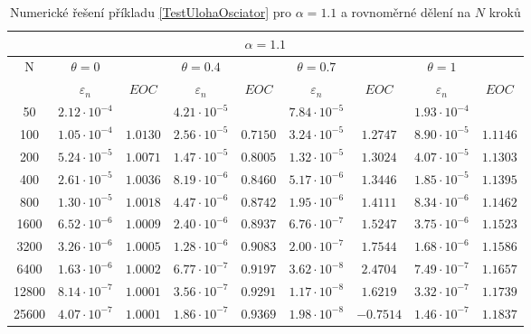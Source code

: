 \documentclass[a4paper,12pt,twoside]{article}
\theoremstyle{definition}
\theoremstyle{remark}
\numberwithin{equation}{section}
\numberwithin{table}{section}
\numberwithin{figure}{section}
\begin{document}
	\begin{table}[h!]
	\centering
	\caption{Numerické řešení příkladu \ref{TestUlohaOsciator} pro $\alpha = 1.1$ a rovnoměrné dělení na $N$ kroků}
	\label{tab:tabulkaTestovacíÚloha(2),alpha=1.1}
	\begin{tabular}{|c||cc|cc|cc|cc|}
		\hline
		\multicolumn{9}{|c|}{$\alpha = 1.1$} \\
		\hline
		N 	  & $\theta = 0$ & & $\theta = 0.4$ && $\theta = 0.7$ & &$\theta = 1$& \\
		\hline
		& $\varepsilon_{n}$    & $EOC$    & $\varepsilon_{n}$    &$EOC$   & $\varepsilon_{n}$    &$EOC$    &$\varepsilon_{n}$    &$EOC$ \\
		50 	  & $2.12 \cdot 10^{-4}$ & 		    & $4.21 \cdot 10^{-5}$ &		& $7.84 \cdot 10^{-5}$ & 	     &$1.93 \cdot 10^{-4}$& \\
		\hline
		100   & $1.05 \cdot 10^{-4}$ & $1.0130$ & $2.56 \cdot 10^{-5}$ &$0.7150$& $3.24 \cdot 10^{-5}$ &$1.2747$ &$8.90 \cdot 10^{-5}$&$1.1146$ \\
		\hline
		200   & $5.24 \cdot 10^{-5}$ & $1.0071$ & $1.47 \cdot 10^{-5}$ &$0.8005$& $1.32 \cdot 10^{-5}$ &$1.3024$ &$4.07 \cdot 10^{-5}$&$1.1303$\\
		\hline
		400   & $2.61 \cdot 10^{-5}$ & $1.0036$ & $8.19 \cdot 10^{-6}$ &$0.8460$& $5.17 \cdot 10^{-6}$ &$1.3446$ &$1.85 \cdot 10^{-5}$&$1.1395$ \\
		\hline
		800   & $1.30 \cdot 10^{-5}$ & $1.0018$ & $4.47 \cdot 10^{-6}$ &$0.8742$& $1.95 \cdot 10^{-6}$ &$1.4111$ &$8.34 \cdot 10^{-6}$&$1.1462$ \\
		\hline
		1600  & $6.52 \cdot 10^{-6}$ & $1.0009$ & $2.40 \cdot 10^{-6}$ &$0.8937$& $6.76 \cdot 10^{-7}$ &$1.5247$ &$3.75 \cdot 10^{-6}$&$1.1523$ \\
		\hline
		3200  & $3.26 \cdot 10^{-6}$ & $1.0005$ & $1.28 \cdot 10^{-6}$ &$0.9083$& $2.00 \cdot 10^{-7}$ &$1.7544$ &$1.68 \cdot 10^{-6}$&$1.1586$ \\
		\hline
		6400  & $1.63 \cdot 10^{-6}$ & $1.0002$ & $6.77 \cdot 10^{-7}$ &$0.9197$& $3.62 \cdot 10^{-8}$ &$2.4704$ &$7.49 \cdot 10^{-7}$&$1.1657$ \\
		\hline
		12800 & $8.14 \cdot 10^{-7}$ & $1.0001$ & $3.56 \cdot 10^{-7}$ &$0.9291$& $1.17 \cdot 10^{-8}$ &$1.6219$ &$3.32 \cdot 10^{-7}$&$1.1739$ \\
		\hline
		25600 & $4.07 \cdot 10^{-7}$ & $1.0001$ & $1.86 \cdot 10^{-7}$ &$0.9369$& $1.98 \cdot 10^{-8}$ &$-0.7514$ &$1.46 \cdot 10^{-7}$&$1.1837$ \\
		\hline
	\end{tabular}
\end{table}
\end{document}
